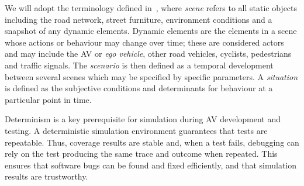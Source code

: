 \documentclass[letterpaper, 10 pt, journal, twoside]{IEEEtran}
\begin{document}
We will adopt the terminology defined in~\cite{Ulbrich2015}, where \textit{scene} refers to all static objects including the road network, street furniture, environment conditions and a snapshot of any dynamic elements. Dynamic elements are the elements in a scene whose actions or behaviour may change over time; these are considered actors and may include the AV or \textit{ego vehicle}, other road vehicles, cyclists, pedestrians and traffic signals. The \textit{scenario} is then defined as a temporal development between several scenes which may be specified by specific parameters. A \textit{situation} is defined as the subjective conditions and determinants for behaviour at a particular point in time.



Determinism is a key prerequisite for simulation during AV development and testing. A deterministic simulation environment guarantees that tests are repeatable. Thus, coverage results are stable and, when a test fails, debugging can rely on the test producing the same trace and outcome when repeated. This ensures that software bugs can be found and fixed efficiently, and that simulation results are trustworthy. 
\end{document}
